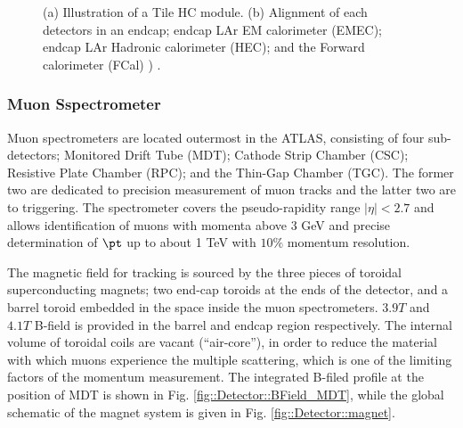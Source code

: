 \begin{figure}[h]
  \centering
    \caption{ (a) Illustration of a Tile HC module. (b)  Alignment of each detectors in an endcap; endcap LAr EM calorimeter (EMEC); endcap LAr Hadronic calorimeter (HEC); and the Forward calorimeter (FCal)   ) \cite{ATLAS_exp}.
      \label{fig::Detector::caloCell} }
\end{figure}




\subsubsection{Muon Sspectrometer}
Muon spectrometers are located outermost in the ATLAS, consisting of four sub-detectors; Monitored Drift Tube (MDT); Cathode Strip Chamber (CSC); Resistive Plate Chamber (RPC); and the Thin-Gap Chamber (TGC). 
The former two are dedicated to precision measurement of muon tracks and the latter two are to triggering. 
The spectrometer covers the pseudo-rapidity range $ |\eta|< 2.7$ and allows identification of muons with momenta above 3 GeV and precise determination of $\pt$ up to about 1 TeV with $10\%$ momentum resolution.

The magnetic field for tracking is sourced by the three pieces of toroidal superconducting magnets; two end-cap toroids at the ends of the detector, and a barrel toroid embedded in the space inside the muon spectrometers. $3.9T$ and $4.1T$ B-field is provided in the barrel and endcap region respectively. The internal volume of toroidal coils are vacant (``air-core''), in order to reduce the material with which muons experience the multiple scattering, which is one of the limiting factors of the momentum measurement. The integrated B-filed profile at the position of MDT is shown in Fig. \ref{fig::Detector::BField_MDT}, while the global schematic of the magnet system is given in Fig. \ref{fig::Detector::magnet}.

